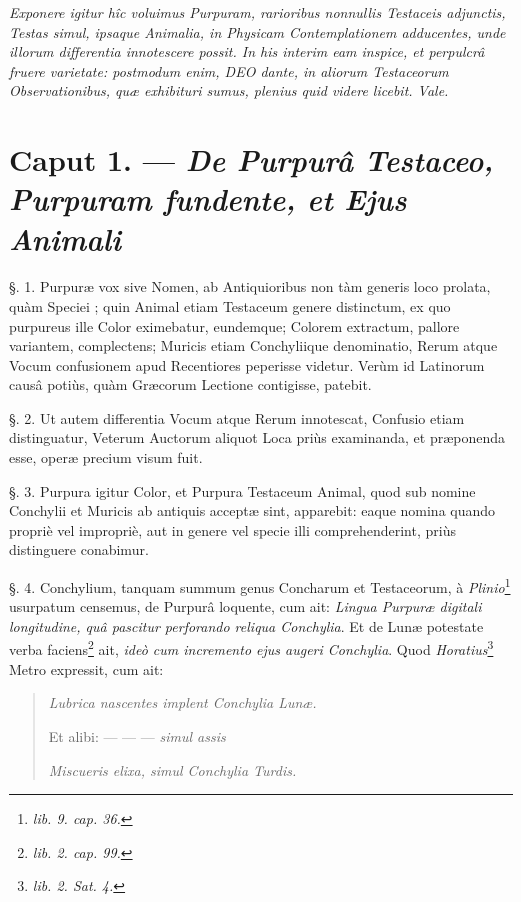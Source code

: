 \documentclass[a4paper, 11pt, oneside, polutonikogreek, german]{article}
\begin{document}
\emph{Exponere igitur hîc voluimus Purpuram, rarioribus nonnullis Testaceis adjunctis, Testas simul, ipsaque Animalia, in Physicam Contemplationem adducentes, unde illorum differentia innotescere possit. In his interim eam inspice, et perpulcrâ fruere varietate: postmodum enim, DEO dante, in aliorum Testaceorum Observationibus, quæ exhibituri sumus, plenius quid videre licebit. Vale.}
\clearpage
\section{Caput 1. --- \emph{De Purpurâ Testaceo, Purpuram fundente, et Ejus Animali}}
\paragraph{}
§. 1. Purpuræ vox sive Nomen, ab Antiquioribus non tàm generis loco prolata, quàm Speciei ; quin Animal etiam Testaceum genere distinctum, ex quo purpureus ille Color eximebatur, eundemque; Colorem extractum, pallore variantem, complectens; Muricis etiam Conchyliique denominatio, Rerum atque Vocum confusionem apud Recentiores peperisse videtur. Verùm id Latinorum causâ potiùs, quàm Græcorum Lectione contigisse, patebit.

§. 2. Ut autem differentia Vocum atque Rerum innotescat, Confusio etiam distinguatur, Veterum Auctorum aliquot Loca priùs examinanda, et præponenda esse, operæ precium visum fuit.

§. 3. Purpura igitur Color, et Purpura Testaceum Animal, quod sub nomine Conchylii et Muricis ab antiquis acceptæ sint, apparebit: eaque nomina quando propriè vel impropriè, aut in genere vel specie illi comprehenderint, priùs distinguere conabimur.

§. 4. Conchylium, tanquam summum genus Concharum et Testaceorum, à \emph{Plinio}\footnote{\emph{lib. 9. cap. 36.}} usurpatum censemus, de Purpurâ loquente, cum ait: \emph{Lingua Purpuræ digitali longitudine, quâ pascitur perforando reliqua Conchylia}. Et de Lunæ potestate verba faciens\footnote{\emph{lib. 2. cap. 99.}} ait, \emph{ideò cum incremento ejus augeri Conchylia}. Quod \emph{Horatius}\footnote{\emph{lib. 2. Sat. 4.}} Metro expressit, cum ait:
\begin{quotation}
\hspace*{12mm}\emph{Lubrica nascentes implent Conchylia Lunæ.}

Et alibi: --- --- --- \emph{simul assis}

\hspace*{12mm}\emph{Miscueris elixa, simul Conchylia Turdis.}
\end{quotation}
\end{document}
